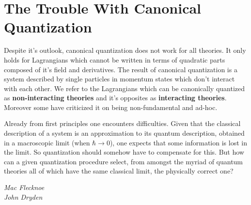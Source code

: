 \section{The Trouble With Canonical Quantization}
Despite it's outlook, canonical quantization does not work for all theories. It only holds for Lagrangians which cannot be written in terms of quadratic parts composed of it's field and derivatives. The result of canonical quantization is a system described by single particles in momentum states which don’t interact with each other. We refer to the Lagrangians which can be canonically quantized as \textbf{non-interacting theories} and it's opposites as \textbf{interacting theories}. Moreover some have criticized it on being non-fundamental and ad-hoc.

\epigraph{Already from first principles one encounters difficulties. Given that the classical description of a system is an approximation to its quantum description, obtained in a macroscopic limit (when $\hbar \rightarrow 0$), one expects that some information is lost in the limit. So quantization should somehow have to compensate for this. But how can a given quantization procedure select, from amongst the myriad of quantum theories all of which have the same classical limit, the physically correct one?}{\textit{Mac Flecknoe \\ John Dryden}}
